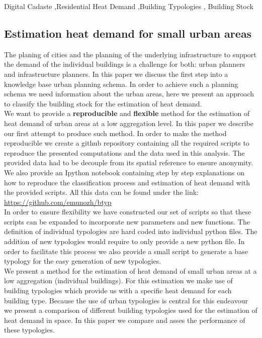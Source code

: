\documentclass[authoryear,preprint,review,12pt]{elsarticle}
\begin{document}
\begin{frontmatter}
\begin{keyword}
    Digital Cadaste \sep Residential Heat Demand \sep Building Typologies \sep
    Building Stock
\end{keyword}

\end{frontmatter}
\begin{linenumbers}

\section{Estimation heat demand for small urban areas}

The planing of cities and the planning of the underlying infrastructure to
support the demand of the individual buildings is a challenge for both: urban
planners and infrastructure planners. In this paper we discuss the first step
into a knowledge base urban planning schema. In order to achieve such a
planning schema we need information about the urban areas, here we present an
approach to classify the building stock for the estimation of heat demand.\\

We want to provide a \textbf{reproducible} and \textbf{flexible} method for the
estimation of heat demand of urban areas at a low aggregation level. In this
paper we describe our first attempt to produce such method. In order to make
the method reproducible we create a github repository containing all the
required scripts to reproduce the presented computations and the data used in
this analysis. The provided data had to be decouple from its spatial reference
to ensure anonymity. We also provide an Ipython notebook containing step by
step explanations on how to reproduce the classification process and estimation
of heat demand with the provided scripts. All this data can be found under the
link: \url{https://github.com/emunozh/btyp}\\

In order to ensure flexibility we have constructed our set of scripts so that
these scripts can be expanded to incorporate new parameters and new functions.
The definition of individual typologies are hard coded into individual python
files. The addition of new typologies would require to only provide a new
python file. In order to facilitate this process we also provide a small script
to generate a base typology for the easy generation of new typologies.\\

We present a method for the estimation of heat demand of small urban areas at a
low aggregation (individual buildings). For this estimation we make use of
building typologies which provide us with a specific heat demand for each
building type. Because the use of urban typologies is central for this
endeavour we present a comparison of different building typologies used for the
estimation of heat demand in space. In this paper we compare and asses the
performance of these typologies.\\


\end{linenumbers}
\end{document}
